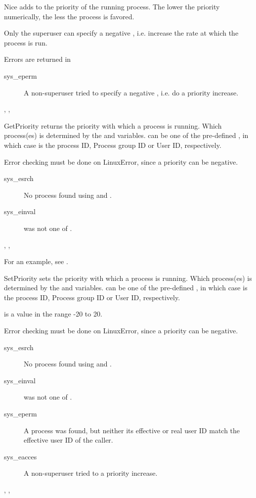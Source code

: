 

{Nice adds  to the priority of the running process. The lower the
priority numerically, the less the process is favored.

Only the superuser can specify a negative , i.e. increase the rate at
which the process is run.
}
{ Errors are returned in 
\begin{description}
\item [sys\_eperm] A non-superuser tried to specify a negative , i.e.
do a priority increase.
\end{description}
}{, , }



{
GetPriority returns the priority with which a process is running.
Which process(es) is determined by the  and  variables.
 can be one of the pre-defined , in which case  is the process ID, Process group ID or
User ID, respectively.
}
{
 Error checking must be done on LinuxError, since a priority can be negative.
 \begin{description}
 \item[sys\_esrch] No process found using  and .
 \item[sys\_einval]  was not one of .
 \end{description}
 }
{, , }

For an example, see .

{
SetPriority sets the priority with which a process is running.
Which process(es) is determined by the  and  variables.
 can be one of the pre-defined , in which case  is the process ID, Process group ID or
User ID, respectively.

 is a value in the range -20 to 20.
}
{
 Error checking must be done on LinuxError, since a priority can be negative.
 \begin{description}
 \item[sys\_esrch] No process found using  and .
 \item[sys\_einval]  was not one of .
 \item[sys\_eperm] A process was found, but neither its effective or real
 user ID match the effective user ID of the caller.
 \item [sys\_eacces] A non-superuser tried to a priority increase.
 \end{description}
 }
{, , }

